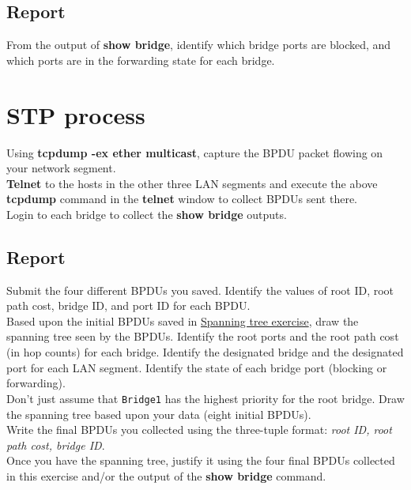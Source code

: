 \documentclass[10pt,a4paper]{article}
\numberwithin{equation}{section}
\numberwithin{figure}{section}
\numberwithin{table}{section}
\begin{document}
    \subsection*{Report}
    From the output of \textbf{show bridge}, identify which bridge ports are blocked, and which ports are in the forwarding state for each bridge.

\section{STP process}
    Using \textbf{tcpdump -ex ether multicast}, capture the BPDU packet flowing on your network segment. \\
    \textbf{Telnet} to the hosts in the other three LAN segments and execute the above \textbf{tcpdump} command in the \textbf{telnet} window to collect BPDUs sent there. \\
    Login to each bridge to collect the \textbf{show bridge} outputs.
    \subsection*{Report}
    Submit the four different BPDUs you saved.
    Identify the values of root ID, root path cost, bridge ID, and port ID for each BPDU. \\
    Based upon the initial BPDUs saved in \href{sec:spanning-tree}{Spanning tree exercise}, draw the spanning tree seen by the BPDUs. Identify the root ports and the root path cost (in hop counts) for each bridge.
    Identify the designated bridge and the designated port for each LAN segment.
    Identify the state of each bridge port (blocking or forwarding). \\
    Don’t just assume that \texttt{Bridge1} has the highest priority for the root bridge.
    Draw the spanning tree based upon your data (eight initial BPDUs). \\
    Write the final BPDUs you collected using the three-tuple format: \textit{{root ID, root path cost, bridge ID}}. \\
    Once you have the spanning tree, justify it using the four final BPDUs collected in this exercise and/or the output of the \textbf{show bridge} command.
\end{document}
